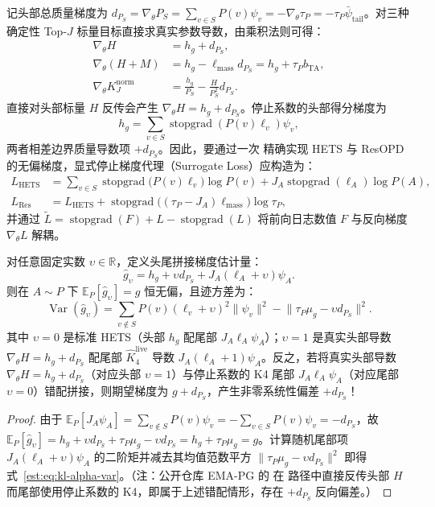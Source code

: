 \documentclass[lang=cn,scheme=chinese,openany]{elegantbook}
\newcommand{\E}{\mathbb E}
\newcommand{\Var}{\operatorname{Var}}
\newcommand{\sg}{\operatorname{stopgrad}}
\newcommand{\tail}{\mathrm{tail}}
\newcommand{\R}{\mathbb R}
\begin{document}
记头部总质量梯度为 $d_{P_S}=\nabla_\theta P_S=\sum_{v\in S}P(v)\psi_v=-\nabla_\theta\tau_P=-\tau_P\bar\psi_\tail$。对三种确定性 Top-$J$ 标量目标直接求真实参数导数，由乘积法则可得：
\begin{align*}
 \nabla_\theta H&=h_g+d_{P_S},\\
 \nabla_\theta(H+M)&=h_g-\ell_{\mathrm{mass}}d_{P_S}=h_g+\tau_P b_{\mathrm{TA}},\\
 \nabla_\theta K_J^{\mathrm{norm}}
 &=\frac{h_g}{P_S}-\frac{H}{P_S^2}d_{P_S}.
\end{align*}
直接对头部标量 $H$ 反传会产生 $\nabla_\theta H=h_g+d_{P_S}$。停止系数的头部得分梯度为
\begin{equation*}
h_g=\sum_{v\in S}\sg(P(v)\ell_v)\psi_v,
\end{equation*}
两者相差边界质量导数项 $+d_{P_S}$。因此，要通过一次  精确实现 HETS 与 ResOPD 的无偏梯度，显式停止梯度代理（Surrogate Loss）应构造为：
\begin{align*}
 L_{\mathrm{HETS}}
 &=\sum_{v\in S}\sg\bigl(P(v)\ell_v\bigr)\log P(v)
   +J_A\sg(\ell_A)\log P(A),\\
 L_{\mathrm{Res}}
 &=L_{\mathrm{HETS}}
   +\sg\bigl((\tau_P-J_A)\ell_{\mathrm{mass}}\bigr)\log\tau_P,
\end{align*}
并通过 $\widetilde L=\sg(F)+L-\sg(L)$ 将前向日志数值 $F$ 与反向梯度 $\nabla_\theta L$ 解耦。

\begin{theorem}[头尾拼接时的得分常数匹配定理]
对任意固定实数 $\upsilon\in\R$，定义头尾拼接梯度估计量：
\begin{equation*}
 \widehat g_\upsilon
 =h_g+\upsilon d_{P_S}+J_A(\ell_A+\upsilon)\psi_A.
\end{equation*}
则在 $A\sim P$ 下 $\E_P[\widehat g_\upsilon]=g$ 恒无偏，且迹方差为：
\begin{equation}
 \Var(\widehat g_\upsilon)
 =\sum_{v\notin S}P(v)(\ell_v+\upsilon)^2\lVert \psi_v\rVert^2
  -\lVert\tau_P\mu_g-\upsilon d_{P_S}\rVert^2.
 \label{est:eq:kl-alpha-var}
\end{equation}
其中 $\upsilon=0$ 是标准 HETS（头部 $h_g$ 配尾部 $J_A\ell_A\psi_A$）；$\upsilon=1$ 是真实头部导数 $\nabla_\theta H=h_g+d_{P_S}$ 配尾部 $\widehat K_4^{\mathrm{live}}$ 导数 $J_A(\ell_A+1)\psi_A$。反之，若将真实头部导数 $\nabla_\theta H=h_g+d_{P_S}$（对应头部 $\upsilon=1$）与停止系数的 K4 尾部 $J_A\ell_A\psi_A$（对应尾部 $\upsilon=0$）错配拼接，则期望梯度为 $g+d_{P_S}$，产生非零系统性偏差 $+d_{P_S}$！
\end{theorem}
\begin{proof}
由于 $\E_P[J_A\psi_A]=\sum_{v\notin S}P(v)\psi_v=-\sum_{v\in S}P(v)\psi_v=-d_{P_S}$，故 $\E_P[\widehat g_\upsilon]=h_g+\upsilon d_{P_S}+\tau_P\mu_g-\upsilon d_{P_S}=h_g+\tau_P\mu_g=g$。计算随机尾部项 $J_A(\ell_A+\upsilon)\psi_A$ 的二阶矩并减去其均值范数平方 $\|\tau_P\mu_g-\upsilon d_{P_S}\|^2$ 即得式~\eqref{est:eq:kl-alpha-var}。（注：公开仓库 EMA-PG  的  在  路径中直接反传头部 $H$ 而尾部使用停止系数的 K4，即属于上述错配情形，存在 $+d_{P_S}$ 反向偏差。）
\end{proof}
\end{document}
